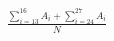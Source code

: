 \documentclass[preview]{standalone}
\begin{document}
\begin{align*}
\frac{\sum_{i= 13 }^{16} A_i + \sum_{i= 24 }^{27} A_i}{N}
\end{align*}
\end{document}

